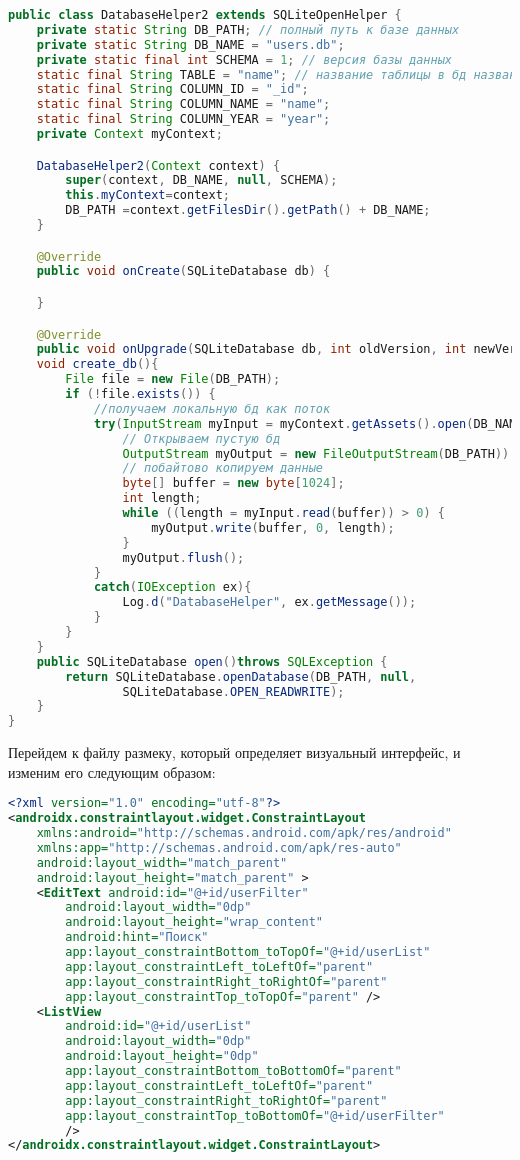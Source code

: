 \begin{lstlisting}[language=Java
	, label=lst:
	]
public class DatabaseHelper2 extends SQLiteOpenHelper {
	private static String DB_PATH; // полный путь к базе данных
	private static String DB_NAME = "users.db";
	private static final int SCHEMA = 1; // версия базы данных
	static final String TABLE = "name"; // название таблицы в бд названия столбцов
	static final String COLUMN_ID = "_id";
	static final String COLUMN_NAME = "name";
	static final String COLUMN_YEAR = "year";
	private Context myContext;

	DatabaseHelper2(Context context) {
		super(context, DB_NAME, null, SCHEMA);
		this.myContext=context;
		DB_PATH =context.getFilesDir().getPath() + DB_NAME;
	}

	@Override
	public void onCreate(SQLiteDatabase db) {

	}

	@Override
	public void onUpgrade(SQLiteDatabase db, int oldVersion, int newVersion) { }
	void create_db(){
		File file = new File(DB_PATH);
		if (!file.exists()) {
			//получаем локальную бд как поток
			try(InputStream myInput = myContext.getAssets().open(DB_NAME);
				// Открываем пустую бд
				OutputStream myOutput = new FileOutputStream(DB_PATH)) {
				// побайтово копируем данные
				byte[] buffer = new byte[1024];
				int length;
				while ((length = myInput.read(buffer)) > 0) {
					myOutput.write(buffer, 0, length);
				}
				myOutput.flush();
			}
			catch(IOException ex){
				Log.d("DatabaseHelper", ex.getMessage());
			}
		}
	}
	public SQLiteDatabase open()throws SQLException {
		return SQLiteDatabase.openDatabase(DB_PATH, null,
				SQLiteDatabase.OPEN_READWRITE);
	}
}
\end{lstlisting}

Перейдем к файлу размеку, который определяет визуальный
интерфейс, и изменим его следующим образом:

\begin{lstlisting}[language=XML
	, label=lst:
	]
<?xml version="1.0" encoding="utf-8"?>
<androidx.constraintlayout.widget.ConstraintLayout
    xmlns:android="http://schemas.android.com/apk/res/android"
    xmlns:app="http://schemas.android.com/apk/res-auto"
    android:layout_width="match_parent"
    android:layout_height="match_parent" >
    <EditText android:id="@+id/userFilter"
        android:layout_width="0dp"
        android:layout_height="wrap_content"
        android:hint="Поиск"
        app:layout_constraintBottom_toTopOf="@+id/userList"
        app:layout_constraintLeft_toLeftOf="parent"
        app:layout_constraintRight_toRightOf="parent"
        app:layout_constraintTop_toTopOf="parent" />
    <ListView
        android:id="@+id/userList"
        android:layout_width="0dp"
        android:layout_height="0dp"
        app:layout_constraintBottom_toBottomOf="parent"
        app:layout_constraintLeft_toLeftOf="parent"
        app:layout_constraintRight_toRightOf="parent"
        app:layout_constraintTop_toBottomOf="@+id/userFilter"
        />
</androidx.constraintlayout.widget.ConstraintLayout>
\end{lstlisting}

